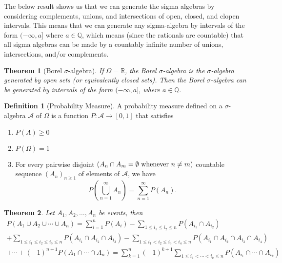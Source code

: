 \documentclass{article}
\newtheorem{theorem}{Theorem}[section]
\theoremstyle{definition}
\newtheorem{definition}{Definition}[section]
\theoremstyle{remark}
\begin{document}
\vspace{.5cm}

\par The below result shows us that we can generate 
the sigma algebras by considering complements, unions, and intersections 
of open, closed, and clopen intervals. This means that we can generate any sigma-algebra
by intervals of the form $(-\infty, a]$ where $a \in \mathbb{Q}$, which means (since 
the rationals are countable) that all sigma algebras can be made by a countably infinite number of 
unions, intersections, and/or complements. 

\begin{theorem}[Borel $\sigma$-algebra]
If $\Omega = \mathbb{R}$, the Borel $\sigma$-algebra is the $\sigma$-algebra generated by open sets (or equivalently closed sets). Then the Borel $\sigma $-algebra can be generated by intervals of the form $ (-\infty, a] $, where $ a \in \mathbb{Q} $.
\end{theorem}

\vspace{.5cm}



\begin{definition}[Probability Measure]\label{def:probability}
A probability measure defined on a $ \sigma $-algebra $\mathcal{A}$ of $\Omega$ is a function $ P: \mathcal{A} \to [0,1] $ that satisfies 
\begin{enumerate}
\item $P(A) \geq 0$
\item $P(\Omega)=1$
\item For every pairwise disjoint $ (A_n \cap A_m = \emptyset \textnormal{ whenever } n \neq m) $ countable sequence $ (A_n)_{n \geq 1} $ of elements of $\mathcal{A}$, we have 
\[
P\left(\bigcup^\infty_{n=1}{A_n}\right) = \sum^\infty_{n=1}{P(A_n)}.
\]
\end{enumerate}
\end{definition}

\vspace{.5cm}


\begin{theorem}\label{thm:additivity of nondisjoint sets}
Let \(A_1, A_2, \dots, A_n\) be events, then
\begin{gather*} P(A_1 \cup A_2 \cup \cdots \cup A_n) = \sum_{i=1}^{n}{P(A_i)} - \sum_{1 \leq i_1 \leq i_2 \leq n}{P(A_{i_1} \cap A_{i_2})}\\ + \sum_{1 \leq i_1 \leq i_2 \leq i_3 \leq n}{P(A_{i_1} \cap A_{i_2} \cap A_{i_3})} - \sum_{1 \leq i_1 < i_2 \leq i_3 < i_4 \leq n}{P(A_{i_1} \cap A_{i_2} \cap A_{i_3} \cap A_{i_4})} \\ + \cdots + (-1)^{n+1}P(A_1 \cap \cdots \cap A_n)  = \sum_{k=1}^{n}(-1)^{k+1} \sum_{1 \leq i_1 < \cdots < i_k \leq n}{P(A_{i_1} \cap \cdots \cap A_{i_k})} 
\end{gather*}

\end{theorem}
\end{document}
